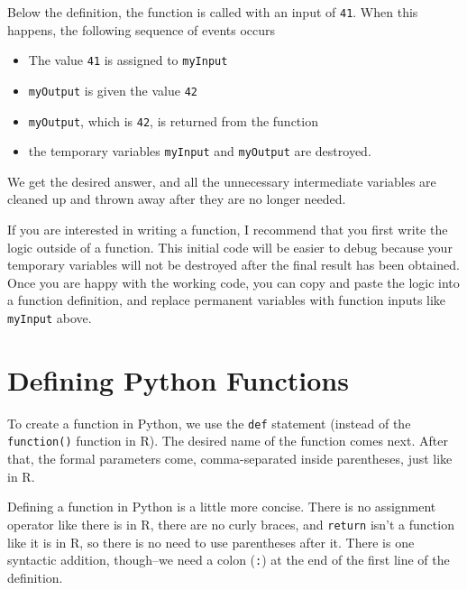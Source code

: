 \documentclass[
  12pt,
  krantz2]{krantz}
\providecommand{\tightlist}{%
  \setlength{\itemsep}{0pt}\setlength{\parskip}{0pt}}
\begin{document}
Below the definition, the function is called with an input of \texttt{41}. When this happens, the following sequence of events occurs

\begin{itemize}
\tightlist
\item
  The value \texttt{41} is assigned to \texttt{myInput}
\item
  \texttt{myOutput} is given the value \texttt{42}
\item
  \texttt{myOutput}, which is \texttt{42}, is returned from the function
\item
  the temporary variables \texttt{myInput} and \texttt{myOutput} are destroyed.
\end{itemize}

We get the desired answer, and all the unnecessary intermediate variables are cleaned up and thrown away after they are no longer needed.

\begin{rmd-caution}
If you are interested in writing a function, I recommend that you first write the logic outside of a function. This initial code will be easier to debug because your temporary variables will not be destroyed after the final result has been obtained. Once you are happy with the working code, you can copy and paste the logic into a function definition, and replace permanent variables with function inputs like \texttt{myInput} above.

\end{rmd-caution}

\hypertarget{defining-python-functions}{%
\section{Defining Python Functions}\label{defining-python-functions}}

To create a function in Python, we use the \texttt{def} statement (instead of the \texttt{function()} function in R). The desired name of the function comes next. After that, the formal parameters come, comma-separated inside parentheses, just like in R.

Defining a function in Python is a little more concise. There is no assignment operator like there is in R, there are no curly braces, and \texttt{return} isn't a function like it is in R, so there is no need to use parentheses after it. There is one syntactic addition, though--we need a colon (\texttt{:}) at the end of the first line of the definition.
\end{document}
